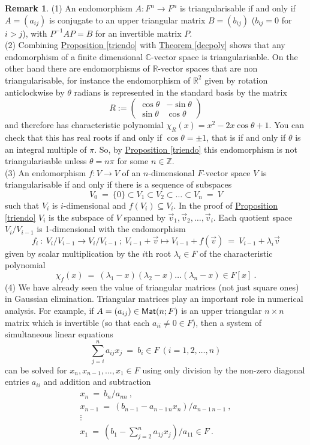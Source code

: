 \documentclass[11pt]{amsbook}
\theoremstyle{definition}
\newtheorem{rem}[theorem]{Remark}
\begin{document}
\begin{rem}
(1) An endomorphism $A:F^n \to F^n$ is triangularisable if and only if $A=(a_{ij})$ is conjugate
to an upper triangular matrix $B=(b_{ij})$ ($b_{ij}=0$ for $i>j$), with $P^{-1}AP=B$ for
an invertible matrix $P$.\\
(2) Combining \hyperref[triendo]{Proposition \ref{triendo}} with \hyperref[decpoly]{Theorem \ref{decpoly}} shows that any endomorphism of a finite dimensional $\mathbb{C}$-vector space is triangularisable. On the other hand there are endomorphisms of $\mathbb{R}$-vector spaces that are non triangularisable, for instance the endomorphism of $\mathbb{R}^2$ given by rotation anticlockwise by $\theta$ radians is represented in the standard basis by the matrix $$ R:=\begin{pmatrix} \cos \theta & -\sin \theta \\ \sin \theta & \cos \theta \end{pmatrix}$$ and therefore has characteristic polynomial $\chi_R (x) = x^2 - 2x \cos \theta + 1$. You can check that this has real roots if and only if $\cos \theta = \pm 1$, that is if and only if $\theta$ is an integral multiple of $\pi$. So, by \hyperref[triendo]{Proposition \ref{triendo}} this endomorphism is not triangularisable unless $\theta = n\pi$ for some $n\in \mathbb{Z}$.\\
(3) An endomorphism $f:V \to V$ of an $n$-dimensional $F$-vector space $V$ is triangularisable if and only if there is a sequence of subspaces
$$V_0~=~\{0\} \subset V_1 \subset V_2 \subset \dots \subset V_n~=~V$$
such that $V_i$ is $i$-dimensional and $f(V_i) \subseteq V_i$. In the proof of
 \hyperref[triendo]{Proposition \ref{triendo}}  $V_i$ is the subspace of $V$ spanned by
$ \vec{v}_1,\vec{v}_2,\dots,\vec{v}_i$. Each quotient space $V_i/V_{i-1}$ is 1-dimensional with the endomorphism
$$f_i~:~V_i/V_{i-1} \to V_i/V_{i-1}~;~V_{i-1}+\vec{v} \mapsto V_{i-1}+f(\vec{v})~=~V_{i-1}+\lambda_i\vec{v}$$
given by scalar multiplication by the $i$th root $\lambda_i\in F$ of the characteristic polynomial
$$\chi_f(x)~=~(\lambda_1-x)(\lambda_2-x) \dots (\lambda_n-x) \in F[x]~.$$
(4) We have already seen the value of triangular matrices (not just square ones) in Gaussian elimination. Triangular matrices play an important role in numerical  analysis. For example, if $A=(a_{ij})\in {\sf Mat}(n;F)$ is an upper triangular $n \times n$ matrix
which is invertible (so that each $a_{ii} \neq 0 \in F$), then a system of simultaneous
linear equations
$$\sum\limits^n_{j=i}a_{ij}x_j~=~b_i \in F~(i=1,2,\dots,n)$$
can be solved for $x_n,x_{n-1},\dots,x_1 \in F$ using only division by the non-zero diagonal entries $a_{ii}$ and addition and subtraction
$$\begin{array}{l}
x_n~=~b_n/a_{nn}~,\\[1ex]
x_{n-1}~=~(b_{n-1}-a_{n-1\,n}x_n)/a_{n-1\, n-1}~,\\[1ex]
\vdots\\[1ex]
x_1~=~(b_1-\sum\limits^n_{j=2}a_{1j}x_j)/a_{11} \in F~.
\end{array}$$
\end{rem}
\end{document}
